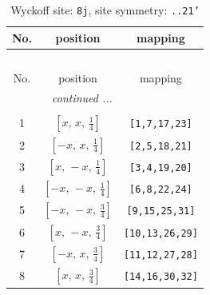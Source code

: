 \documentclass[fleqn,8pt]{jsarticle}
\begin{document}
\begin{longtable}{ccc}
\caption{Wyckoff site: {\tt 8j}, site symmetry: {\tt ..21'}}
 \\
 \hline \hline
No. & position & mapping \\ \hline \endfirsthead

\multicolumn{2}{l}{\tablename\ \thetable{}} \\
 \hline \hline
No. & position & mapping \\ \hline \endhead

 \hline \hline
\multicolumn{2}{r}{\footnotesize\it continued ...} \\ \endfoot

 \hline \hline
\multicolumn{2}{r}{} \\ \endlastfoot

1 & $\left[ x,\, x,\, \frac{1}{4} \right]$ & {\tt [1,7,17,23]} \\ \hline
2 & $\left[ - x,\, x,\, \frac{1}{4} \right]$ & {\tt [2,5,18,21]} \\ \hline
3 & $\left[ x,\, - x,\, \frac{1}{4} \right]$ & {\tt [3,4,19,20]} \\ \hline
4 & $\left[ - x,\, - x,\, \frac{1}{4} \right]$ & {\tt [6,8,22,24]} \\ \hline
5 & $\left[ - x,\, - x,\, \frac{3}{4} \right]$ & {\tt [9,15,25,31]} \\ \hline
6 & $\left[ x,\, - x,\, \frac{3}{4} \right]$ & {\tt [10,13,26,29]} \\ \hline
7 & $\left[ - x,\, x,\, \frac{3}{4} \right]$ & {\tt [11,12,27,28]} \\ \hline
8 & $\left[ x,\, x,\, \frac{3}{4} \right]$ & {\tt [14,16,30,32]} \\
\end{longtable}
\renewcommand{\arraystretch}{1.2}
\end{document}
